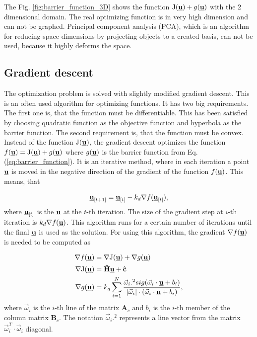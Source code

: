 \documentclass[a4paper,11pt,titlepage]{article}
\newcommand{\uvec}{\textbf{\underline{u}}}
\newcommand{\macJ}{\mathrm{J}(\uvec)}
\newcommand{\macf}{f(\uvec)}
\newcommand{\macg}{g(\uvec)}
\newcommand{\macoi}{\vec{\omega}_i}
\begin{document}
The Fig. \ref{fig:barrier_function_3D} shows the function $\macJ + \macg$ with the 2 dimensional domain. The real optimizing function is in very high dimension and can not be graphed. Principal component analysis (PCA), which is an algorithm for reducing space dimensions by projecting objects to a created basis, can not be used, because it highly deforms the space.

\subsection{Gradient descent}
\label{sec:gradient_descent}
The optimization problem is solved with slightly modified gradient descent. This is an often used algorithm for optimizing functions. It has two big requirements. The first one is, that the function must be differentiable. This has been satisfied by choosing quadratic function as the objective function and hyperbola as the barrier function. The second requirement is, that the function must be convex. Instead of the function $\macJ$, the gradient descent optimizes the function $\macf = \macJ + \macg$ where $\macg$ is the barrier function from Eq. (\ref{eq:barrier_function}). 
It is an iterative method, where in each iteration a point $\uvec$ is moved in the negative direction of the gradient of the function $f(\uvec)$. This means, that 

\begin{equation}
\label{eq:gradient_descend}
\uvec_{[t+1]} = \uvec_{[t]} - k_d \nabla f(\uvec_{[t]}),
\end{equation}
where $\uvec_{[t]}$ is the $\uvec$ at the $t$-th iteration. The size of the gradient step at $i$-th iteration is $k_d \nabla \macf$.  This algorithm runs for a certain number of iterations until the final $\uvec$ is used as the solution. For using this algorithm, the gradient $\nabla \macf$ is needed to be computed as

\begin{equation}
\begin{split}
\nabla \macf &= \nabla \macJ + \nabla \macg\\
\nabla\macJ &= \textbf{\^H}\uvec + \textbf{\^c}\\
\nabla \macg &= k_g\sum_{i = 1}^N
\frac{\macoi.^2sig(\macoi\cdot\uvec+b_i)}
{|\macoi|\cdot(\macoi \cdot \uvec + b_i)},
\end{split}
\end{equation}
where $\macoi$ is the $i$-th line of the matrix $\textbf{A}_c$ and $b_i$ is the $i$-th member of the column matrix $\textbf{B}_c$. The notation $\macoi.^2$ represents a line vector from the matrix $\macoi^T \cdot \macoi$ diagonal. 
\end{document}
